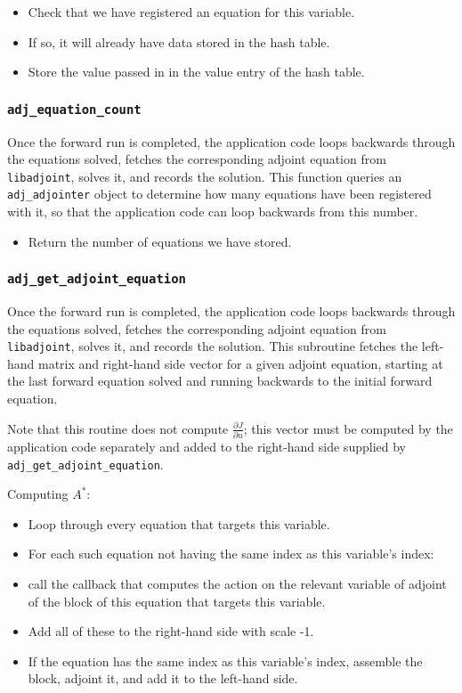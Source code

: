 \documentclass[10pt,authoryear]{elsarticle}
\newcommand{\libadjoint}[0]{{\texttt{libadjoint}}}
\begin{document}
\begin{itemize}
\item Check that we have registered an equation for this variable. 
\item If so, it will already have data stored in the hash table.
\item Store the value passed in in the value entry of the hash table.
\end{itemize}

\subsubsection{\texttt{{adj\_equation\_count}}}
Once the forward run is completed, the application code loops backwards through the equations solved,
fetches the corresponding adjoint equation from \libadjoint, solves it, and records the solution.
This function queries an \texttt{adj\_adjointer} object to determine how many equations have been registered
with it, so that the application code can loop backwards from this number.

\begin{itemize}
\item Return the number of equations we have stored.
\end{itemize}
 
\subsubsection{\texttt{{adj\_get\_adjoint\_equation}}}
Once the forward run is completed, the application code loops backwards through the equations solved,
fetches the corresponding adjoint equation from \libadjoint, solves it, and records the solution.
This subroutine fetches the left-hand matrix and right-hand side vector for a given adjoint equation,
starting at the last forward equation solved and running backwards to the initial forward equation.

Note that this routine does not compute $\frac{\partial J}{\partial u}$; this vector must be computed
by the application code separately and added to the right-hand side supplied by \texttt{adj\_get\_adjoint\_equation}.

Computing $A^{*}$:
\begin{itemize}
\item Loop through every equation that targets this variable.
\item For each such equation not having the same index as this variable's index:
\item call the callback that computes the action on the relevant variable of adjoint of the block of this equation
that targets this variable.
\item Add all of these to the right-hand side with scale -1.
\item If the equation has the same index as this variable's index, assemble the block, adjoint it, and add it to the
left-hand side.
\end{itemize}
\end{document}
